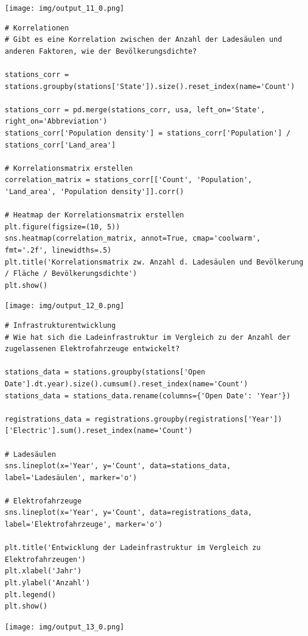 \texttt{[image: img/output\_11\_0.png]}

\begin{verbatim}
# Korrelationen
# Gibt es eine Korrelation zwischen der Anzahl der Ladesäulen und anderen Faktoren, wie der Bevölkerungsdichte?

stations_corr = stations.groupby(stations['State']).size().reset_index(name='Count')

stations_corr = pd.merge(stations_corr, usa, left_on='State', right_on='Abbreviation')
stations_corr['Population density'] = stations_corr['Population'] / stations_corr['Land_area']

# Korrelationsmatrix erstellen
correlation_matrix = stations_corr[['Count', 'Population', 'Land_area', 'Population density']].corr()

# Heatmap der Korrelationsmatrix erstellen
plt.figure(figsize=(10, 5))
sns.heatmap(correlation_matrix, annot=True, cmap='coolwarm', fmt='.2f', linewidths=.5)
plt.title('Korrelationsmatrix zw. Anzahl d. Ladesäulen und Bevölkerung / Fläche / Bevölkerungsdichte')
plt.show()
\end{verbatim}

\texttt{[image: img/output\_12\_0.png]}
 
\begin{verbatim}
# Infrastrukturentwicklung
# Wie hat sich die Ladeinfrastruktur im Vergleich zu der Anzahl der zugelassenen Elektrofahrzeuge entwickelt?

stations_data = stations.groupby(stations['Open Date'].dt.year).size().cumsum().reset_index(name='Count')
stations_data = stations_data.rename(columns={'Open Date': 'Year'})

registrations_data = registrations.groupby(registrations['Year'])['Electric'].sum().reset_index(name='Count')

# Ladesäulen
sns.lineplot(x='Year', y='Count', data=stations_data, label='Ladesäulen', marker='o')

# Elektrofahrzeuge
sns.lineplot(x='Year', y='Count', data=registrations_data, label='Elektrofahrzeuge', marker='o')

plt.title('Entwicklung der Ladeinfrastruktur im Vergleich zu Elektrofahrzeugen')
plt.xlabel('Jahr')
plt.ylabel('Anzahl')
plt.legend()
plt.show()
\end{verbatim}

\texttt{[image: img/output\_13\_0.png]}